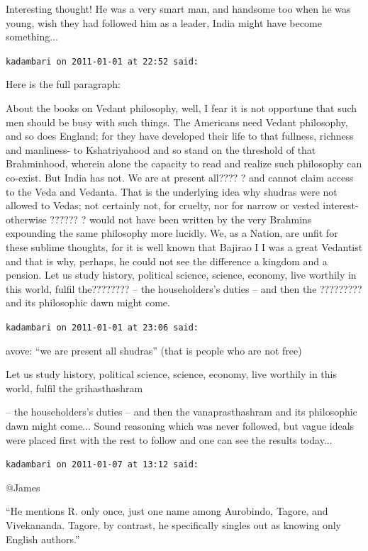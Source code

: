 \begin{footnotesize}
\begin{sffamily}
Interesting thought! He was a very smart man, and handsome too when he was young, wish they had followed him as a leader, India might have become something... 

\hfill

\texttt{kadambari on 2011-01-01 at 22:52 said:}

Here is the full paragraph:

About the books on Vedant philosophy, well, I fear it is not opportune that such men should be busy with such things. The Americans need Vedant philosophy, and so does England; for they have developed their life to that fullness, richness and manliness- to Kshatriyahood and so stand on the threshold of that Brahminhood, wherein alone the capacity to read and realize such philosophy can co-exist. But India has not. We are at present all???? ? and cannot claim access to the Veda and Vedanta. That is the underlying idea why shudras were not allowed to Vedas; not certainly not, for cruelty, nor for narrow or vested interest- otherwise ?????? ? would not have been written by the very Brahmins expounding the same philosophy more lucidly. We, as a Nation, are unfit for these sublime thoughts, for it is well known that Bajirao I I was a great Vedantist and that is why, perhaps, he could not see the difference a kingdom and a pension. Let us study history, political science, science, economy, live worthily in this world, fulfil the???????? -- the householders's duties -- and then the ????????? and its philosophic dawn might come.

\hfill

\texttt{kadambari on 2011-01-01 at 23:06 said:}

avove: ``we are present all shudras'' (that is people who are not free)

Let us study history, political science, science, economy, live worthily in this world, fulfil the grihasthashram

-- the householders's duties -- and then the vanaprasthashram and its philosophic dawn might come... Sound reasoning which was never followed, but vague ideals were placed first with the rest to follow and one can see the results today... 

\hfill

\texttt{kadambari on 2011-01-07 at 13:12 said:}

@James

``He mentions R. only once, just one name among Aurobindo, Tagore, and Vivekananda. Tagore, by contrast, he specifically singles out as knowing only English authors.''


\end{sffamily}
\end{footnotesize}

